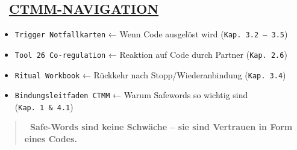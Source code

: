 \hypertarget{ctmm-navigation}{%
\subsection{\texorpdfstring{🧭 \textbf{\ul{CTMM-NAVIGATION}}}{🧭 CTMM-NAVIGATION}}\label{ctmm-navigation}}

\begin{itemize}
\tightlist
\item
  \texttt{T}\texttt{rigger}\texttt{\ }\texttt{N}\texttt{otfallkarten} ← Wenn Code ausgelöst wird (\texttt{Kap.}\texttt{\ }\texttt{3.2\ –\ 3.5})
\item
  \texttt{T}\texttt{ool}\texttt{\ }\texttt{26}\texttt{\ C}\texttt{o}\texttt{-}\texttt{regulation} ← Reaktion auf Code durch Partner (\texttt{Kap.}\texttt{\ }\texttt{2.6})
\item
  \texttt{R}\texttt{itual}\texttt{\ W}\texttt{orkbook} ← Rückkehr nach Stopp/Wiederanbindung (\texttt{Kap.}\texttt{\ }\texttt{3.4})
\item
  \texttt{B}\texttt{indungsleitfaden}\texttt{\ CTMM} ← Warum Safewords so wichtig sind (\texttt{Kap.\ }\texttt{1}\texttt{\ }\texttt{\&}\texttt{\ }\texttt{4.1})
\end{itemize}

\begin{quote}
\textbf{📎 Safe-Words sind keine Schwäche -- sie sind Vertrauen in Form eines Codes.}
\end{quote}


